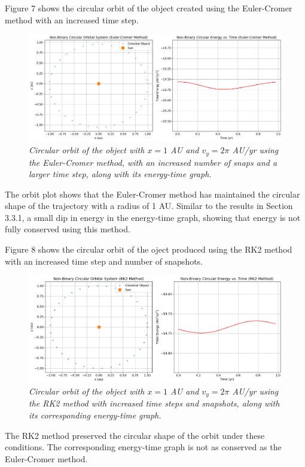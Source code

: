\documentclass[11 pt, a4paper, twocolumn]{article}
\begin{document}
Figure 7 shows the circular orbit of the object created using the Euler-Cromer method 
with an increased time step.
\begin{figure}[H]
  \includegraphics[width=1\linewidth]{Euler cromer/eulercromercircularincrease.png}
  \centering
  \caption{\textit{Circular orbit of the object with $x = 1$ AU and $v_y = 2\pi$ AU/yr using the 
  Euler-Cromer method, with an increased number of snaps and a larger time step, along with its
  energy-time graph.}} 
\end{figure}
The orbit plot shows that the Euler-Cromer method has maintained the circular shape of the trajectory
with a radius of 1 AU. Similar to the results in Section 3.3.1, a small dip in energy in the
energy-time graph, showing that energy is not fully conserved using this method.

Figure 8 shows the circular orbit of the oject produced using the RK2 method with an increased time 
step and number of snapshots.
\begin{figure}[H]
  \includegraphics[width=1\linewidth]{RK2/rk2circularincrease.png}
  \centering
  \caption{\textit{Circular orbit of the object with $x = 1$ AU and $v_y = 2\pi$ AU/yr using the
  RK2 method with increased time steps and snapshots, along with its corresponding energy-time graph.}} 
\end{figure}
\vspace{-1em}
The RK2 method preserved the circular shape of the orbit under these conditions. The corresponding 
energy-time graph is not as conserved as the Euler-Cromer method.
\end{document}

